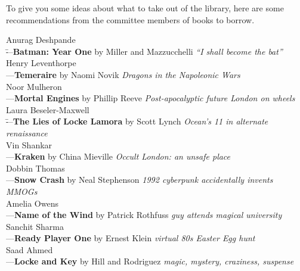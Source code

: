 To give you some ideas about what to take out of the library, here are some recommendations from the committee members of books to borrow. 

\par\vspace{-1em}
\parbox{0.4\textwidth}{
\begin{tabbing}
Anurag Deshpande\\ \quad\=---\quad \textbf{Batman: Year One} by Miller and Mazzucchelli \textit{``I shall become the bat''}\\
Henry Leventhorpe \\ \>---\quad \textbf{Temeraire} by Naomi Novik \textit{Dragons in the Napoleonic Wars}\\
Noor Mulheron\\ \>---\quad \textbf{Mortal Engines} by Phillip Reeve \textit{Post-apocalyptic future London on wheels}\\
Laura Beseler-Maxwell\\ \quad\=---\quad \textbf{The Lies of Locke Lamora} by Scott Lynch \textit{Ocean's 11 in alternate renaissance}\\
Vin Shankar \\ \>---\quad \textbf{Kraken} by China Mieville \textit{Occult London: an unsafe place}\\
Dobbin Thomas\\ \>---\quad \textbf{Snow Crash} by Neal Stephenson \textit{1992 cyberpunk accidentally invents MMOGs}\\
Amelia Owens\\ \>---\quad \textbf{Name of the Wind} by Patrick Rothfuss \textit{guy attends magical university}\\
Sanchit Sharma\\ \>---\quad \textbf{Ready Player One} by Ernest Klein \textit{virtual 80s Easter Egg hunt}\\
Saad Ahmed\\ \>---\quad \textbf{Locke and Key} by Hill and Rodriguez \textit{magic, mystery, craziness, suspense}\\
\end{tabbing}
}
